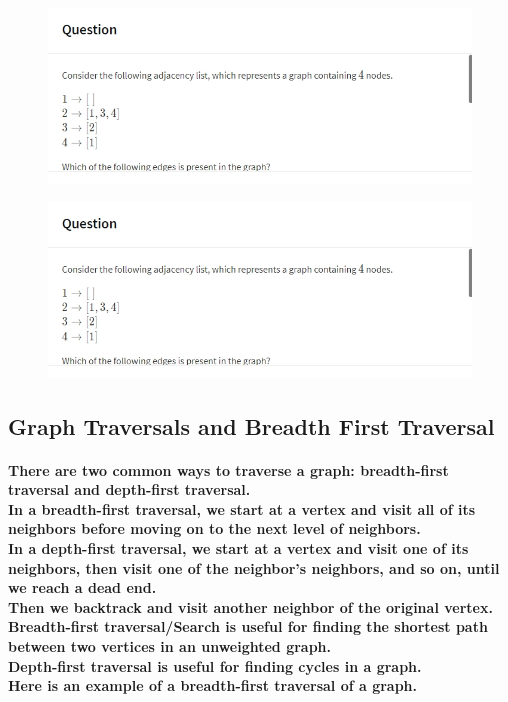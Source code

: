 \documentclass{article}
\begin{document}
\begin{figure}[H]
    \includegraphics[width=\textwidth]{graphquestion2-1.png}
\end{figure}

\begin{figure}[H]
    \includegraphics[width=\textwidth]{graphquestion2-1.png}
\end{figure}

\subsection{Graph Traversals and Breadth First Traversal}

\paragraph{
    There are two common ways to traverse a graph: breadth-first traversal and depth-first traversal.\\
    In a breadth-first traversal, we start at a vertex and visit all of its neighbors before moving on to the next level of neighbors.\\
    In a depth-first traversal, we start at a vertex and visit one of its neighbors, then visit one of the neighbor's neighbors, and so on, until we reach a dead end.\\
    Then we backtrack and visit another neighbor of the original vertex.\\
    Breadth-first traversal/Search is useful for finding the shortest path between two vertices in an unweighted graph.\\
    Depth-first traversal is useful for finding cycles in a graph.\\
    Here is an example of a breadth-first traversal of a graph.\\
}
\end{document}
